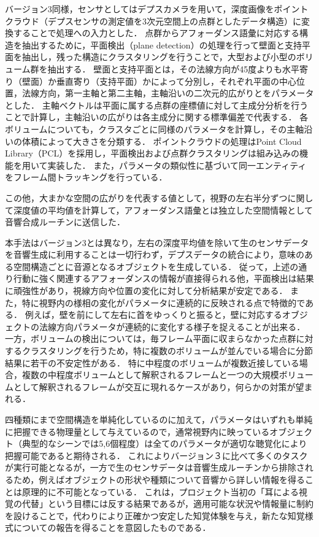 バージョン3同様，センサとしてはデプスカメラを用いて，深度画像をポイントクラウド（デプスセンサの測定値を3次元空間上の点群としたデータ構造）に変換することで処理への入力とした．
点群からアフォーダンス語彙に対応する構造を抽出するために，平面検出（plane detection）の処理を行って壁面と支持平面を抽出し，残った構造にクラスタリングを行うことで，大型および小型のボリューム群を抽出する．
壁面と支持平面とは，その法線方向が45度よりも水平寄り（壁面）か垂直寄り（支持平面）かによって分別し，それぞれ平面の中心位置，法線方向，第一主軸と第二主軸，主軸沿いの二次元的広がりとをパラメータとした．
主軸ベクトルは平面に属する点群の座標値に対して主成分分析を行うことで計算し，主軸沿いの広がりは各主成分に関する標準偏差で代表する．
各ボリュームについても，クラスタごとに同様のパラメータを計算し，その主軸沿いの体積によって大きさを分類する．
ポイントクラウドの処理はPoint Cloud Library（PCL）を採用し，平面検出および点群クラスタリングは組み込みの機能を用いて実装した．
また，パラメータの類似性に基づいて同一エンティティをフレーム間トラッキングを行っている．

この他，大まかな空間の広がりを代表する値として，視野の左右半分ずつに関して深度値の平均値を計算して，アフォーダンス語彙とは独立した空間情報として音響合成ルーチンに送信した．

本手法はバージョン3とは異なり，左右の深度平均値を除いて生のセンサデータを音響生成に利用することは一切行わず，デプスデータの統合により，意味のある空間構造ごとに音源となるオブジェクトを生成している．
従って，上述の通り行動に強く関連するアフォーダンスの情報が直接得られる他，平面検出は結果に頑強性があり，視線方向や位置の変化に対して分析結果が安定である．
また，特に視野内の様相の変化がパラメータに連続的に反映される点で特徴的である．
例えば，壁を前にして左右に首をゆっくりと振ると，壁に対応するオブジェクトの法線方向パラメータが連続的に変化する様子を捉えることが出来る．
一方，ボリュームの検出については，毎フレーム平面に収まらなかった点群に対するクラスタリングを行うため，特に複数のボリュームが並んでいる場合に分節結果に若干の不安定性がある．
特に中程度のボリュームが複数近接している場合，複数の中程度ボリュームとして解釈されるフレームと一つの大規模ボリュームとして解釈されるフレームが交互に現れるケースがあり，何らかの対策が望まれる．

四種類にまで空間構造を単純化しているのに加えて，パラメータはいずれも単純に把握できる物理量として与えているので，通常視野内に映っているオブジェクト（典型的なシーンでは5,6個程度）は全てのパラメータが適切な聴覚化により把握可能であると期待される．
これによりバージョン３に比べて多くのタスクが実行可能となるが，一方で生のセンサデータは音響生成ルーチンから排除されるため，例えばオブジェクトの形状や種類について音響から詳しい情報を得ることは原理的に不可能となっている．
これは，プロジェクト当初の「耳による視覚の代替」という目標には反する結果であるが，適用可能な状況や情報量に制約を設けることで，代わりにより正確かつ安定した知覚体験を与え，新たな知覚様式についての報告を得ることを意図したものである．

